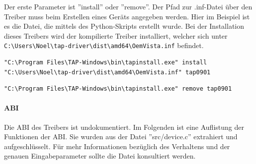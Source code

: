 {Der erste Parameter ist ''install'' oder ''remove''. Der Pfad zur .inf-Datei
über den Treiber muss beim Erstellen eines Geräts angegeben werden. Hier im Beispiel
ist es die Datei, die mittels des Python-Skripts erstellt wurde. Bei der Installation
dieses Treibers wird der kompilierte Treiber installiert, welcher sich unter 
\texttt{C:\textbackslash{}Users\textbackslash{}Noel\textbackslash{}tap-driver\textbackslash{}dist\textbackslash{}amd64\textbackslash{}OemVista.inf}
befindet.

\begin{lstlisting}[caption=Erstellung eines TAP-Geraets]
"C:\Program Files\TAP-Windows\bin\tapinstall.exe" install "C:\Users\Noel\tap-driver\dist\amd64\OemVista.inf" tap0901
\end{lstlisting}

\begin{lstlisting}[caption=Löschung aller TAP-Geraete]
"C:\Program Files\TAP-Windows\bin\tapinstall.exe" remove tap0901
\end{lstlisting}

\paragraph{ABI}
Die \ac{ABI} des Treibers ist undokumentiert. Im Folgenden ist eine Auflistung
der Funktionen der \ac{ABI}. Sie wurden aus der Datei ''src/device.c'' extrahiert
und aufgeschlüsselt. Für mehr Informationen bezüglich des Verhaltens und der
genauen Eingabeparameter sollte die Datei konsultiert werden.

}
